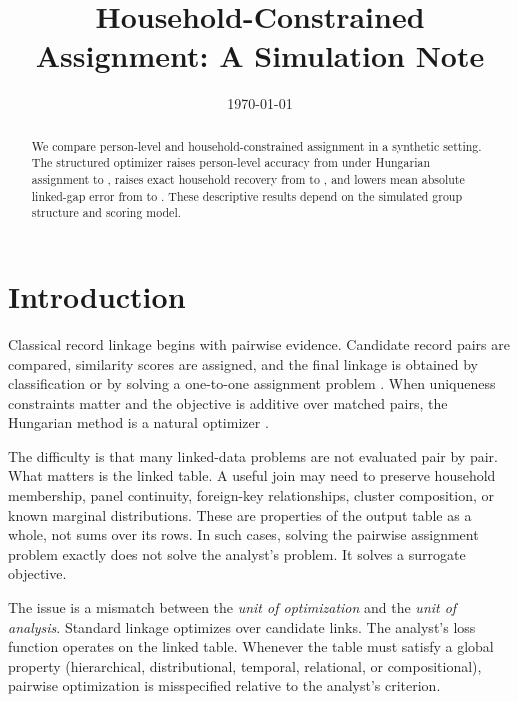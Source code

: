 \documentclass[11pt]{article}
\title{\textbf{Household-Constrained Assignment: A Simulation Note}}
\author{}
\date{\today}
\theoremstyle{remark}
\begin{document}
\maketitle

\begin{abstract}
We compare person-level and household-constrained assignment in a synthetic setting. The structured optimizer raises person-level accuracy from \HungarianPersonAcc{} under Hungarian assignment to \SetAwarePersonAcc{}, raises exact household recovery from \HungarianHHExact{} to \SetAwareHHExact{}, and lowers mean absolute linked-gap error from \HungarianGapError{} to \SetAwareGapError{}. These descriptive results depend on the simulated group structure and scoring model.
\end{abstract}

\section{Introduction}

Classical record linkage begins with pairwise evidence. Candidate record pairs are compared, similarity scores are assigned, and the final linkage is obtained by classification or by solving a one-to-one assignment problem \citep{FellegiSunter1969}. When uniqueness constraints matter and the objective is additive over matched pairs, the Hungarian method is a natural optimizer \citep{Kuhn1955}.

The difficulty is that many linked-data problems are not evaluated pair by pair. What matters is the linked table. A useful join may need to preserve household membership, panel continuity, foreign-key relationships, cluster composition, or known marginal distributions. These are properties of the output table as a whole, not sums over its rows. In such cases, solving the pairwise assignment problem exactly does not solve the analyst's problem. It solves a surrogate objective.

The issue is a mismatch between the \emph{unit of optimization} and the \emph{unit of analysis}. Standard linkage optimizes over candidate links. The analyst's loss function operates on the linked table. Whenever the table must satisfy a global property (hierarchical, distributional, temporal, relational, or compositional), pairwise optimization is misspecified relative to the analyst's criterion.
\end{document}
